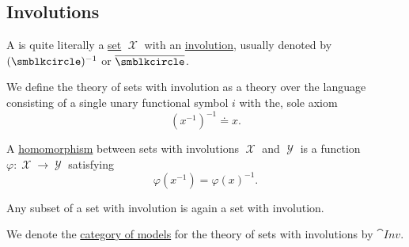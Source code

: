 \subsection{Involutions}\label{subsec:involutions}

\begin{definition}\label{def:set_with_involution}
  A  is quite literally a \hyperref[def:set]{set} \( \mscrX \) with an \hyperref[def:multi_valued_function/involution]{involution}, usually denoted by \( (\placeholder)^{-1} \) or \( \overline \placeholder \).

  \begin{thmenum}
     We define the theory of sets with involution as a theory over the language consisting of a single unary functional symbol \( i \) with the, sole axiom
    \begin{equation}\label{eq:def:set_with_involution/theory/axiom}
      (x^{-1})^{-1} \doteq x.
    \end{equation}

     A \hyperref[def:first_order_homomorphism]{homomorphism} between sets with involutions \( \mscrX \) and \( \mscrY \) is a function \( \varphi: \mscrX \to \mscrY \) satisfying
    \begin{equation}\label{eq:def:set_with_involution/homomorphism}
      \varphi(x^{-1})
      =
      \varphi(x)^{-1}.
    \end{equation}

     Any subset of a set with involution is again a set with involution.

     We denote the \hyperref[def:category_of_first_order_models]{category of models} for the theory of sets with involutions by \( \cat{Inv} \).
  \end{thmenum}
\end{definition}
